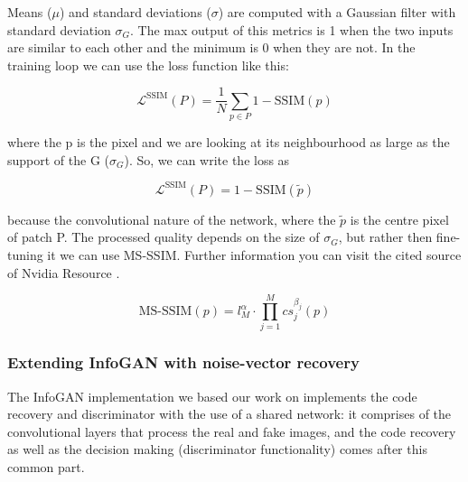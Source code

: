 \documentclass{egpubl}
\begin{document}
Means ($\mu$) and standard deviations ($\sigma$) are computed with a Gaussian filter with standard deviation $\sigma_G$. The max output of this metrics is 1 when the two inputs are similar to each other and the minimum is 0 when they are not. In the training loop we can use the loss function like this:

\begin{equation}
\mathcal{L}^{\mathrm{SSIM}}(P) = \frac{1}{N}\sum_{p \in P}1-\mathrm{SSIM}(p)
\end{equation}

where the p is the pixel and we are looking at its neighbourhood as large as the support of the G ($\sigma_G$). So, we can write the loss as

\begin{equation}
\mathcal{L}^{\mathrm{SSIM}}(P) = 1-\mathrm{SSIM}(\tilde{p})
\end{equation}

because the convolutional nature of the network, where the $\tilde{p}$ is the centre pixel of patch P. 
The processed quality depends on the size of $\sigma_G$, but rather then fine-tuning it we can use MS-SSIM. Further information you can visit the cited source of Nvidia Resource \cite{zhao2015loss}.

\begin{equation}
\mathrm{MS\mbox{-}SSIM}(p) = l_M^\alpha \cdot \prod_{j=1}^{M}cs_j^{\beta_j}(p)
\end{equation}



\subsubsection{Extending InfoGAN with noise-vector recovery}

The InfoGAN implementation we based our work on implements the code recovery and discriminator with the use of a shared network: it comprises of the convolutional layers that process the real and fake images, and the code recovery as well as the decision making (discriminator functionality) comes after this common part.
\end{document}
